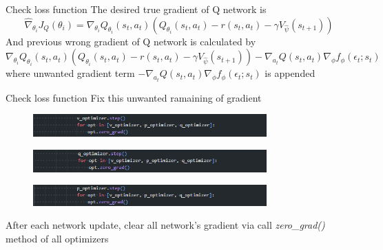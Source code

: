 \documentclass[8pt]{beamer}
\newcommand{\ti}[1]{\textit{#1}}
\begin{document}
\begin{frame}{Check loss function}
    The desired true gradient of Q network is 
    \[
     \hat{\nabla}_{\theta_i} J_Q (\theta_i) = \nabla_{\theta_i} Q_{\theta_i} (s_t, a_t) \left(Q_{\theta_i}(s_t, a_t) - r(s_t, a_t) - \gamma V_{\hat{\psi}}(s_{t+1}) \right)
    \]
    And previous wrong gradient of Q network is calculated by
    \[
        \nabla_{\theta_i} Q_{\theta_i} (s_t, a_t) \left(Q_{\theta_i}(s_t, a_t) - r(s_t, a_t) - \gamma V_{\hat{\psi}}(s_{t+1}) \right) - \nabla_{a_t} Q(s_t, a_t) \nabla_\phi f_\phi (\epsilon_t; s_t)
    \]
    where unwanted gradient term $- \nabla_{a_t} Q(s_t, a_t) \nabla_\phi f_\phi (\epsilon_t; s_t)$ is appended
\end{frame}

\begin{frame}{Check loss function}
    Fix this unwanted ramaining of gradient
    \begin{figure}
        \includegraphics[width=0.8\textwidth]{AllOptimizerUpdate1.png}
    \end{figure}
    \begin{figure}
        \includegraphics[width=0.8\textwidth]{AllOptimizerUpdate2.png}
    \end{figure}
    \begin{figure}
        \includegraphics[width=0.8\textwidth]{AllOptimizerUpdate3.png}
    \end{figure}

    After each network update, clear all network's gradient via call \ti{zero\_grad()} method of all optimizers
\end{frame}
\end{document}
